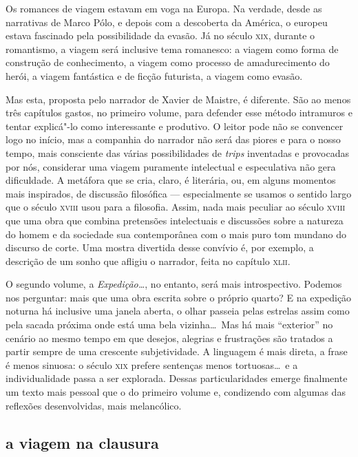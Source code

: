 Os romances de viagem estavam em voga na Europa. Na verdade, desde as
narrativas de Marco Pólo, e depois com a descoberta da América, o
europeu estava fascinado pela possibilidade da evasão. Já no século
\textsc{xix}, durante o romantismo, a viagem será inclusive tema romanesco: a
viagem como forma de construção de conhecimento, a viagem como processo
de amadurecimento do herói, a viagem fantástica e de ficção futurista,
a viagem como evasão.

Mas esta, proposta pelo narrador de Xavier de Maistre, é diferente. São
ao menos três capítulos gastos, no primeiro volume, para defender esse
método intramuros e tentar explicá"-lo como interessante e produtivo. O
leitor pode não se convencer logo no início, mas a companhia do
narrador não será das piores e para o nosso tempo, mais consciente das
várias possibilidades de \textit{trips} inventadas e provocadas por
nós, considerar uma viagem puramente intelectual e especulativa não
gera dificuldade. A metáfora que se cria, claro, é literária, ou, em
alguns momentos mais inspirados, de discussão filosófica ---
especialmente se usamos o sentido largo que o século \textsc{xviii} usou para a        %
filosofia. Assim, nada mais peculiar ao século \textsc{xviii} que uma obra que combina
pretensões intelectuais e discussões sobre a natureza do homem e da
sociedade sua contemporânea com o mais puro tom mundano do discurso de                %
corte. Uma mostra divertida desse convívio é, por exemplo, a descrição
de um sonho que afligiu o narrador, feita no capítulo \textsc{xlii}.

 O segundo volume, a \textit{Expedição\ldots}, no entanto, será mais
introspectivo. Podemos nos perguntar: mais que uma obra escrita sobre o
próprio quarto? E na expedição noturna há inclusive uma janela aberta,
o olhar passeia pelas estrelas assim como pela sacada próxima onde está
uma bela vizinha\ldots\ Mas há mais ``exterior'' no cenário ao mesmo tempo em
que desejos, alegrias e frustrações são tratados a partir sempre de uma
crescente subjetividade. A linguagem é mais direta, a frase é menos
sinuosa: o século \textsc{xix} prefere sentenças menos tortuosas\ldots\ e a
individualidade passa a ser explorada. Dessas particularidades emerge
finalmente um texto mais pessoal que o do primeiro volume e, condizendo
com algumas das reflexões desenvolvidas, mais melancólico. 

\subsection{a viagem na clausura}

